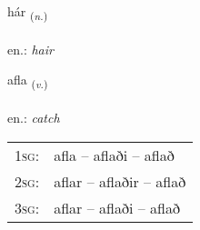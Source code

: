 \documentclass[frontgrid, backgrid]{flacards}\usepackage[]{graphicx}\usepackage[]{xcolor}
\begin{document}
\renewcommand{\flhead}{\vskip5pt \fboxsep=0pt {\small\bfseries\footnotesize Nafnorð | Noun}}
\renewcommand{\fcfoot}{\vskip5pt \fboxsep=0pt \hspace{2pt}{\small\bfseries\footnotesize 2K}}

\renewcommand{\blhead}{\vskip5pt {\small\bfseries\footnotesize Nafnorð | Noun }}
\renewcommand{\bcfoot}{\vskip5pt \hspace{2pt}{\small\bfseries\footnotesize 2K}}


{hár \small{\textsubscript{(\textit{n.})}} \\[1ex] %
\textphonetic{[hauːr]} \\
en.: \emph{hair} \\  [2ex]
\renewcommand*{\arraystretch}{0.8}
}

\renewcommand{\flhead}{\vskip5pt \fboxsep=0pt {\small\bfseries\footnotesize Sagnorð | Verb}}
\renewcommand{\fcfoot}{\vskip5pt \fboxsep=0pt \hspace{2pt}{\small\bfseries\footnotesize 2K}}

\renewcommand{\blhead}{\vskip5pt {\small\bfseries\footnotesize Sagnorð | Verb }}
\renewcommand{\bcfoot}{\vskip5pt \hspace{2pt}{\small\bfseries\footnotesize 2K}}


{afla \small{\textsubscript{(\textit{v.})}} \\[1ex] %
\textphonetic{[apla]} \\
en.: \emph{catch} \\  [2ex]
\renewcommand*{\arraystretch}{0.8}
\begin{tabular}{p{1cm}l}
\textsc{1sg}: & afla -- aflaði -- aflað \\ 
\textsc{2sg}: & aflar -- aflaðir -- aflað \\ 
\textsc{3sg}: & aflar -- aflaði -- aflað \\ 
\end{tabular}
}
\end{document}
